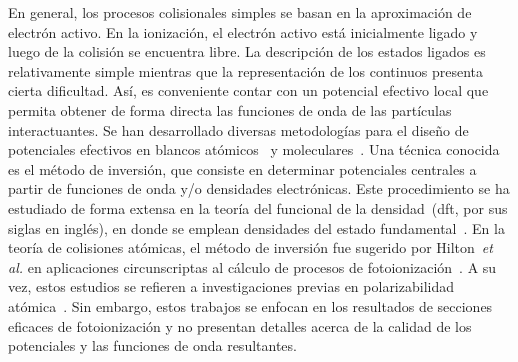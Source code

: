 En general, los procesos colisionales simples se basan en la 
aproximación de electrón activo. En la ionización, el electrón activo 
está inicialmente ligado y luego de la colisión se encuentra libre. La 
descripción de los estados ligados es relativamente simple mientras que 
la representación de los continuos presenta cierta dificultad. Así, es 
conveniente contar con un potencial efectivo local que permita obtener 
de forma directa las funciones de onda de las partículas interactuantes. 
Se han desarrollado diversas metodologías para el diseño de potenciales 
efectivos en blancos atómicos~\cite{Hibbert:82,Gombas:56,Green:69,
Klapisch:71,Phillips:59,Herman:63,Dalgarno:70,Bayliss:77,Cowan:76,
Lee:77} y moleculares~\cite{Menchero:10,Granados:16}. Una técnica 
conocida es el método de inversión, que consiste en determinar 
potenciales centrales a partir de funciones de onda y/o densidades 
electrónicas. Este procedimiento se ha estudiado de forma extensa en la 
teoría del funcional de la densidad~(\acs{dft}, por sus siglas en 
inglés), en donde se emplean densidades del estado 
fundamental~\cite{Wu:03,Gaiduk:13,Ryabinkin:15,Schipper:97,deSilva:12,
Kananenka:13,Jacob:11}. En la teoría de colisiones atómicas, el método 
de inversión fue sugerido por Hilton~\textit{et al.} en aplicaciones 
circunscriptas al cálculo de procesos de fotoionización~\cite{Hilton:77,
Suzer:77,Hilton:79,Hilton:80,Crljen:87}. A su vez, estos estudios se 
refieren a investigaciones previas en polarizabilidad 
atómica~\cite{Sternheimer:54,Dalgarno:59}. Sin embargo, estos trabajos 
se enfocan en los resultados de secciones eficaces de fotoionización y 
no presentan detalles acerca de la calidad de los potenciales y las 
funciones de onda resultantes. 

